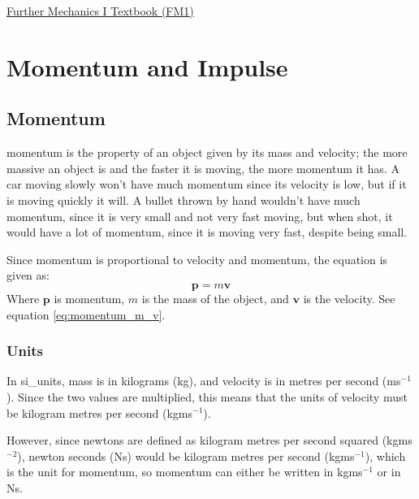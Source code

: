 \href{https://drive.google.com/drive/folders/1gXPjSqIhp6e2FcUWDM4XryDPhp6EqsRh}{\hypertarget{book:FM1}{Further Mechanics I Textbook (FM1)}}

\section{Momentum and Impulse} \label{momentum_and_impulse}
    \subsection{Momentum}
        \Gls{momentum} is the property of an object given by its mass and velocity; the more massive an object is and the faster it is moving, the more \gls{momentum} it has.
        A car moving slowly won't have much \gls{momentum} since its velocity is low, but if it is moving quickly it will.
        A bullet thrown by hand wouldn't have much \gls{momentum}, since it is very small and not very fast moving, but when shot, it would have a lot of \gls{momentum}, since it is moving very fast, despite being small.
        
        Since \gls{momentum} is proportional to velocity and \gls{momentum}, the equation is given as:
        \begin{equation}
            \textbf{p}=m\textbf{v}
        \end{equation}
        Where $\textbf{p}$ is \gls{momentum}, $m$ is the mass of the object, and $\textbf{v}$ is the velocity.
        See equation \ref{eq:momentum_m_v}.

        \subsubsection{Units}
        In \glspl{si_unit}, \gls{mass} is in \glspl{kilogram} (kg), and \gls{velocity} is in \glspl{metre} per \gls{second} (ms$^{-1}$).
        Since the two values are multiplied, this means that the units of \gls{velocity} must be \gls{kilogram} \glspl{metre} per \gls{second} (kgms$^{-1}$).
        
        However, since newtons are defined as \gls{kilogram} \glspl{metre} per \gls{second} squared (kgms$^{-2}$), newton \glspl{second} (Ns) would be \gls{kilogram} \glspl{metre} per \gls{second} (kgms$^{-1}$), which is the unit for \gls{momentum}, so \gls{momentum} can either be written in kgms$^{-1}$ or in Ns.

